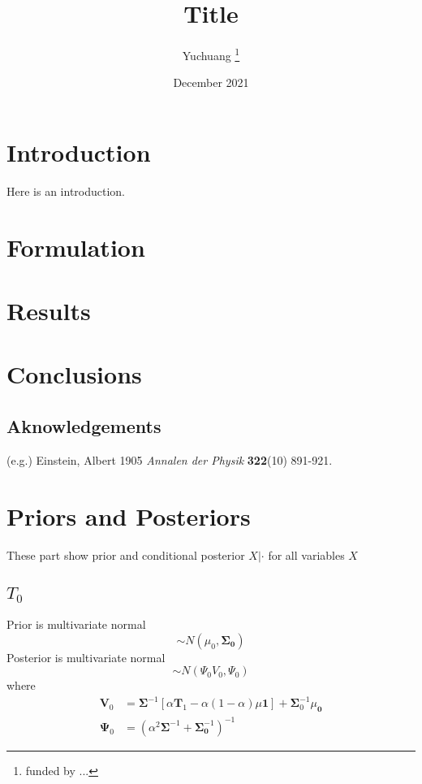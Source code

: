 \documentclass[12pt, letterpaper]{article}
\title{Title}
\author{Yuchuang \thanks{funded by ...}}
\date{December 2021}
\begin{document}
	
\begin{titlepage}
	\maketitle
\end{titlepage}


\section{Introduction}
Here is an introduction.

\section{Formulation}



\newpage
\section{Results}



\section{Conclusions}

\subsection*{Aknowledgements}


%
\begin{thebibliography}{}
 (e.g.) Einstein, Albert 1905 {\it Annalen der Physik} {\bf 322}(10) 891-921.
%
\end{thebibliography}

\clearpage
\appendix
\section{Priors and Posteriors}
These part show prior and conditional posterior $X|\cdot$ for all variables $X$

\subsection{$T_0$}
Prior is multivariate normal
\begin{equation}
	\sim N\left(\mu_{0}, \mathbf{\Sigma_0}\right)
\end{equation}
Posterior is multivariate normal
\begin{equation}
	\sim N(\Psi_0V_0,\Psi_0)
\end{equation} 
where
\begin{align}
\mathbf{V}_{0}&=\mathbf{\Sigma}^{-1}\left[\alpha \mathbf{T}_{1}-\alpha(1-\alpha) \mu \mathbf{1}\right]+\mathbf{\Sigma}_{0}^{-1} \mu_{\mathbf{0}}\\
\boldsymbol{\Psi}_{0}&=\left(\alpha^{2} \boldsymbol{\Sigma}^{-1}+\boldsymbol{\Sigma}_{\mathbf{0}}^{-1}\right)^{-1}
\end{align}
\end{document}
